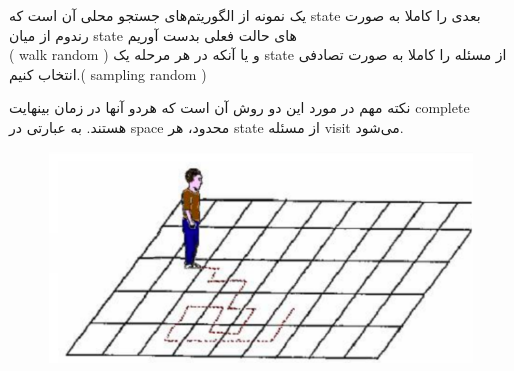 یک نمونه از الگوریتم‌های جستجو محلی آن است که state بعدی را کاملا به صورت رندوم از میان state های حالت فعلی بدست آوریم \\ ( walk random ) و یا آنکه در هر مرحله یک state از مسئله را کاملا به صورت تصادفی انتخاب کنیم.( sampling random )

نکته مهم در مورد این دو روش آن است که هردو آنها در زمان بینهایت complete هستند.
به عبارتی در space محدود، هر state از مسئله visit می‌شود.

\begin{figure}[H]
    \centering
    \includegraphics[width=0.8\linewidth]{source/random-walk.png}
    \label{fig:random-walk}
\end{figure}